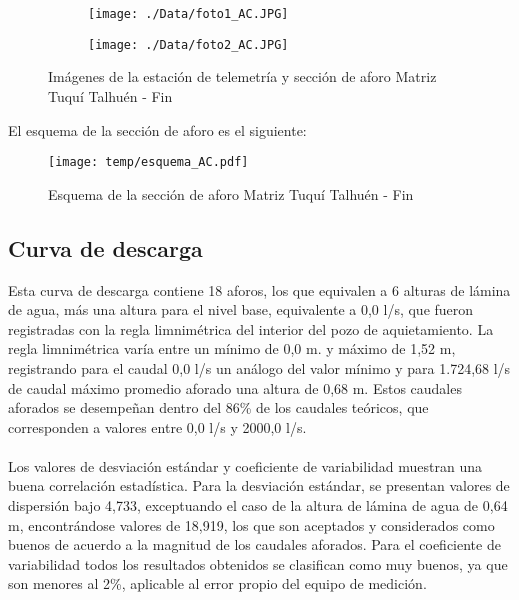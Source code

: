 \documentclass[]{article}
\begin{document}
\begin{figure}[H]
  \centering
\begin{subfigure}{.49\textwidth}
  \texttt{[image: ./Data/foto1\_AC.JPG]}
\end{subfigure}
\hfill
\begin{subfigure}{.49\textwidth}
  \texttt{[image: ./Data/foto2\_AC.JPG]}
\end{subfigure}
\caption{Imágenes de la estación de telemetría y sección de aforo Matriz Tuquí Talhuén - Fin}
\label{fig:fotos_3}
\end{figure}

El esquema de la sección de aforo es el siguiente:

\begin{figure}[H]
  \centering
  \texttt{[image: temp/esquema\_AC.pdf]}
\caption{Esquema de la sección de aforo Matriz Tuquí Talhuén - Fin}
\label{fig:Esquema_AC}
\end{figure}

\subsection{Curva de descarga}\label{curva-de-descarga-2}

Esta curva de descarga contiene 18 aforos, los que equivalen a 6 alturas de lámina de agua, más una altura para el nivel base, equivalente a 0,0 l/s, que fueron registradas con la regla limnimétrica del interior del pozo de aquietamiento. La regla limnimétrica varía entre un mínimo de 0,0 m. y máximo de 1,52 m, registrando para el caudal 0,0 l/s un análogo del valor mínimo y para 1.724,68 l/s de caudal máximo promedio aforado una altura de 0,68 m. Estos caudales aforados se desempeñan dentro del 86\% de los caudales teóricos, que corresponden a valores entre 0,0 l/s y 2000,0 l/s.\\
\\
Los valores de desviación estándar y coeficiente de variabilidad muestran una buena correlación estadística. Para la desviación estándar, se presentan valores de dispersión bajo 4,733, exceptuando el caso de la altura de lámina de agua de 0,64 m, encontrándose valores de 18,919, los que son aceptados y considerados como buenos de acuerdo a la magnitud de los caudales aforados. Para el coeficiente de variabilidad todos los resultados obtenidos se clasifican como muy buenos, ya que son menores al 2\%, aplicable al error propio del equipo de medición.
\end{document}
